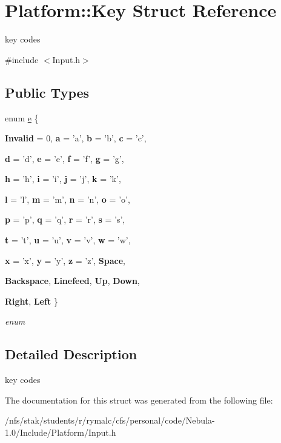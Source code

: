 \hypertarget{structPlatform_1_1Key}{
\section{Platform::Key Struct Reference}
\label{structPlatform_1_1Key}
}


key codes  


{\ttfamily \#include $<$Input.h$>$}\subsection*{Public Types}
\begin{DoxyCompactItemize}
\item 
enum \hyperlink{structPlatform_1_1Key_a349a23d226d1f8971c5f8e9281f464b6}{e} \{ \par
{\bfseries Invalid} =  0, 
{\bfseries a} =  'a', 
{\bfseries b} =  'b', 
{\bfseries c} =  'c', 
\par
{\bfseries d} =  'd', 
{\bfseries e} =  'e', 
{\bfseries f} =  'f', 
{\bfseries g} =  'g', 
\par
{\bfseries h} =  'h', 
{\bfseries i} =  'i', 
{\bfseries j} =  'j', 
{\bfseries k} =  'k', 
\par
{\bfseries l} =  'l', 
{\bfseries m} =  'm', 
{\bfseries n} =  'n', 
{\bfseries o} =  'o', 
\par
{\bfseries p} =  'p', 
{\bfseries q} =  'q', 
{\bfseries r} =  'r', 
{\bfseries s} =  's', 
\par
{\bfseries t} =  't', 
{\bfseries u} =  'u', 
{\bfseries v} =  'v', 
{\bfseries w} =  'w', 
\par
{\bfseries x} =  'x', 
{\bfseries y} =  'y', 
{\bfseries z} =  'z', 
{\bfseries Space}, 
\par
{\bfseries Backspace}, 
{\bfseries Linefeed}, 
{\bfseries Up}, 
{\bfseries Down}, 
\par
{\bfseries Right}, 
{\bfseries Left}
 \}
\begin{DoxyCompactList}\small\item\em enum \item\end{DoxyCompactList}\end{DoxyCompactItemize}


\subsection{Detailed Description}
key codes 

The documentation for this struct was generated from the following file:\begin{DoxyCompactItemize}
\item 
/nfs/stak/students/r/rymalc/cfs/personal/code/Nebula-\/1.0/Include/Platform/Input.h\end{DoxyCompactItemize}

